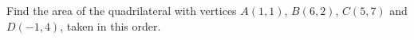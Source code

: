 Find the area of the quadrilateral with vertices $A(1,1)$, $B(6,2)$, $C(5,7)$ and $D(-1,4)$, taken in this order.
